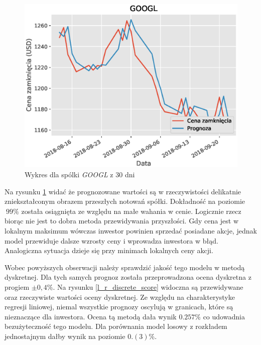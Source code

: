 \documentclass[a4paper, twoside, 11pt, openright]{article}
\begin{document}
\begin{figure}[H]
\centering \includegraphics[scale=0.9]{img/linear_regression/l_r_1_day_last_30}
\caption{Wykres dla spólki \textit{GOOGL} z 30 dni}
\label{l_r_1_day_last_30}
\end{figure}

Na rysunku \ref{l_r_1_day_last_30} widać że prognozowane wartości są w rzeczywistości delikatnie zniekształconym obrazem przeszłych notowań spółki. Dokładność na poziomie $~99\%$ została osiągnięta ze względu na małe wahania w cenie. Logicznie rzecz biorąc nie jest to dobra metoda przewidywania przyszłości. Gdy cena jest w lokalnym maksimum wówczas inwestor powinien sprzedać posiadane akcje, jednak model przewiduje dalsze wzrosty ceny i wprowadza inwestora w błąd. Analogiczna sytuacja dzieje się przy minimach lokalnych ceny akcji. 



\bigskip

Wobec powyższych obserwacji należy sprawdzić jakość tego modelu w metodą dyskretnej. Dla tych samych prognoz została przeprowadzona ocena dyskretna z progiem $\pm0,4\%$. Na rysunku \ref{l_r_discrete_score} widoczna są przewidywane oraz rzeczywiste wartości oceny dyskretnej. Ze względu na charakterystyke regresji liniowej, niemal wszystkie prognozy oscylują w granicach, które są nieznaczące dla inwestora. Ocena tą metodą dała wynik $0.257\%$ co udowadnia bezużyteczność tego modelu. Dla porównania model losowy z rozkładem jednostajnym dałby wynik na poziomie $0.(3)\%$.
\end{document}
